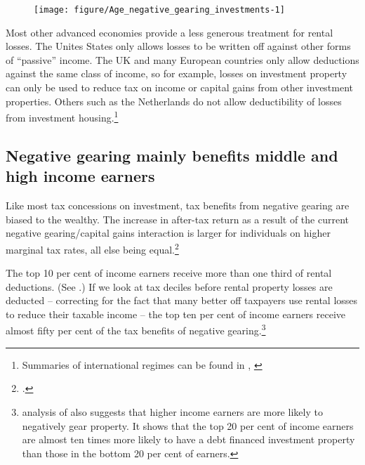 \documentclass{grattan}\usepackage[]{graphicx}\usepackage[]{color}
\makeatletter
\newenvironment{kframe}{%
 \def\at@end@of@kframe{}%
 \ifinner\ifhmode%
  \def\at@end@of@kframe{\end{minipage}}%
  \begin{minipage}{\columnwidth}%
 \fi\fi%
 \def\FrameCommand##1{\hskip\@totalleftmargin \hskip-\fboxsep
 \colorbox{shadecolor}{##1}\hskip-\fboxsep
     \hskip-\linewidth \hskip-\@totalleftmargin \hskip\columnwidth}%
 \MakeFramed {\advance\hsize-\width
   \@totalleftmargin\z@ \linewidth\hsize
   \@setminipage}}%
 {\par\unskip\endMakeFramed%
 \at@end@of@kframe}
\newenvironment{knitrout}{}{} %
\newcommand\gao{Grattan analysis of}
\makeatother
\begin{document}
\begin{knitrout}
\color{fgcolor}\begin{kframe}


{\ttfamily\noindent\bfseries{}}\end{kframe}
\end{knitrout}
\begin{figure}
\texttt{[image: figure/Age\_negative\_gearing\_investments-1]}

\source{\gao\ \textcite{ATO2013i}}
\end{figure}

Most other advanced economies provide a less generous treatment for rental losses. The Unites States only allows losses to be written off against other forms of ``passive'' income. The UK and many European countries only allow deductions against the same class of income, so for example, losses on investment property can only be used to reduce tax on income or capital gains from other investment properties. Others such as the Netherlands do not allow deductibility of losses from investment housing.\footnote{Summaries of international regimes can be found in \textcite[p.~43]{RBA2014} \textcite[p.~86]{Commission2004}, \textcite[pp.~92-95]{ODonnell2005}}%

\subsection{Negative gearing mainly benefits middle and high income earners}
Like most tax concessions on investment, tax benefits from negative gearing are biased to the wealthy. The increase in after-tax return as a result of the current negative gearing/capital gains interaction is larger for individuals on higher marginal tax rates, all else being equal.\footcite{Inquiry2014}   

The top 10 per cent of income earners receive more than one third of rental deductions. (See .) If we look at tax deciles before rental property losses are deducted -- correcting for the fact that many better off taxpayers use rental losses to reduce their taxable income -- the top ten per cent of income earners receive almost fifty per cent of the tax benefits of negative gearing.\footnote{\textcite{RBA2015} analysis of \textcite{HILDA2015} also suggests that higher income earners are more likely to negatively gear property. It shows that the top 20 per cent of income earners are almost ten times more likely to have a debt financed investment property than those in the bottom 20 per cent of earners.} 
\end{document}
